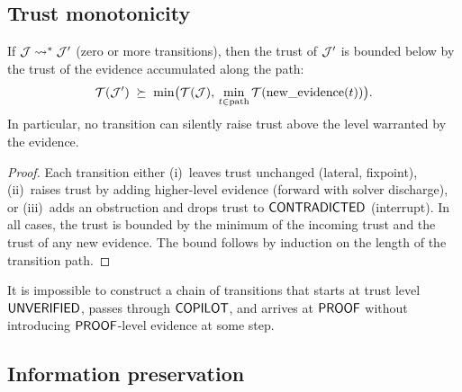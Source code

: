 \documentclass[11pt]{article}
\begin{document}
\subsection{Trust monotonicity}

\begin{theorem}\label{thm:trust-mono}
If $\mathcal{J} \leadsto^* \mathcal{J}'$ (zero or more transitions), then the trust of $\mathcal{J}'$
is bounded below by the trust of the evidence accumulated along the path:
\[
  \mathcal{T}(\mathcal{J}') \;\succeq\;
    \min\bigl(\mathcal{T}(\mathcal{J}),\,
    \min_{t \in \mathrm{path}} \mathcal{T}(\mathrm{new\_evidence}(t))\bigr).
\]
In particular, no transition can silently raise trust above the level
warranted by the evidence.
\end{theorem}

\begin{proof}
Each transition either (i)~leaves trust unchanged (lateral, fixpoint),
(ii)~raises trust by adding higher-level evidence (forward with solver
discharge), or (iii)~adds an obstruction and drops trust to $\mathsf{CONTRADICTED}$
(interrupt).  In all cases, the trust is bounded by the minimum of the
incoming trust and the trust of any new evidence.  The bound follows by
induction on the length of the transition path.
\end{proof}

\begin{corollary}
It is impossible to construct a chain of transitions that starts at trust
level $\mathsf{UNVERIFIED}$, passes through $\mathsf{COPILOT}$, and arrives at $\mathsf{PROOF}$
without introducing $\mathsf{PROOF}$-level evidence at some step.
\end{corollary}

\subsection{Information preservation}
\end{document}
